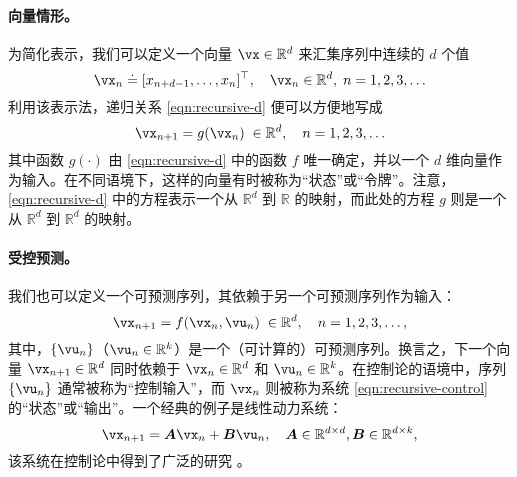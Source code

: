 \documentclass[../../book-main.tex]{subfiles}
\begin{document}
\paragraph{向量情形。} 
为简化表示，我们可以定义一个向量 $\vx \in \mathbb{R}^d$ 来汇集序列中连续的 $d$ 个值
\begin{equation}
    \vx_n \doteq [x_{n+d-1}, \ldots,  x_{n}]^\top, \quad \vx_n \in \mathbb{R}^d, \; n = 1, 2, 3, \ldots
\end{equation}
利用该表示法，递归关系 \eqref{eqn:recursive-d} 便可以方便地写成
\begin{equation}
    \vx_{n+1} = g(\vx_{n}) \; \in \mathbb{R}^d, \quad n =  1, 2, 3, \ldots
    \label{eqn:recursive-v}
\end{equation}
其中函数 $g(\cdot)$ 由 \eqref{eqn:recursive-d} 中的函数 $f$ 唯一确定，并以一个 $d$ 维向量作为输入。在不同语境下，这样的向量有时被称为“状态”或“令牌”。注意，\eqref{eqn:recursive-d} 中的方程表示一个从 $\mathbb{R}^d$ 到 $\mathbb{R}$ 的映射，而此处的方程 $g$ 则是一个从 $\mathbb{R}^d$ 到 $\mathbb{R}^d$ 的映射。


\paragraph{受控预测。}
我们也可以定义一个可预测序列，其依赖于另一个可预测序列作为输入：
\begin{equation}
    \vx_{n+1} = f(\vx_{n}, \vu_n) \; \in \mathbb{R}^d, \quad n =  1, 2, 3, \ldots,
\label{eqn:recursive-control}
\end{equation}
其中，$\{\vu_n\}$（$\vu_n \in \mathbb{R}^k$）是一个（可计算的）可预测序列。换言之，下一个向量 $\vx_{n+1} \in \mathbb{R}^d$ 同时依赖于 $\vx_n \in \mathbb{R}^d$ 和 $\vu_n \in \mathbb{R}^k$。在控制论的语境中，序列 $\{\vu_n\}$ 通常被称为“控制输入”，而 $\vx_n$ 则被称为系统 \eqref{eqn:recursive-control} 的“状态”或“输出”。一个经典的例子是线性动力系统：
\begin{equation}
    \vx_{n+1} = \boldsymbol{A}\vx_n + \boldsymbol{B}\vu_n, \quad \boldsymbol{A} \in \mathbb{R}^{d\times d}, \boldsymbol{B} \in \mathbb{R}^{d\times k},
    \label{eqn:lineary-system} 
\end{equation}
该系统在控制论中得到了广泛的研究 \cite{Cal:Des}。
\end{document}
